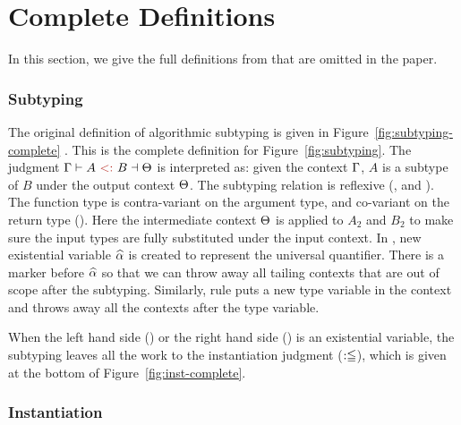 \section{Complete Definitions}
\label{sec:appendix-complete-definition}

In this section, we give the full definitions from \citet{dunfield2013complete} that are omitted in the paper.

\subsubsection{Subtyping}

\begin{figure*}[t]
  \caption{Algorithmic Subtyping (Original).}
  \label{fig:subtyping-complete}
\end{figure*}

The original definition of algorithmic subtyping is given in
Figure~\ref{fig:subtyping-complete} \citep{dunfield2013complete}. This is the complete definition for
Figure~\ref{fig:subtyping}.
The judgment $\tctx \bysub A \tsub B \toctx$ is
interpreted as: given the context $\Gamma$, $A$ is a subtype of $B$ under the
output context $\Theta$.
The subtyping relation is reflexive (,  and
). The function type is contra-variant on the argument type,
and co-variant on the return type (\rul{$\to$}). Here the intermediate context
$\Theta$ is applied to $A_2$ and $B_2$ to make sure the input types are fully
substituted under the input context. In , new existential
variable $\widehat{\alpha}$ is created to represent the universal quantifier. There is a
marker before $\widehat{\alpha}$ so that we can throw away all tailing contexts that are
out of scope after the subtyping. Similarly, rule  puts a
new type variable in the context and throws away all the contexts after the type variable.

When the left hand side () or the right hand side () is an
existential variable, the subtyping leaves all the work to the instantiation
judgment ($:\leqq$), which is given at the bottom of Figure~\ref{fig:inst-complete}.

\subsubsection{Instantiation}


